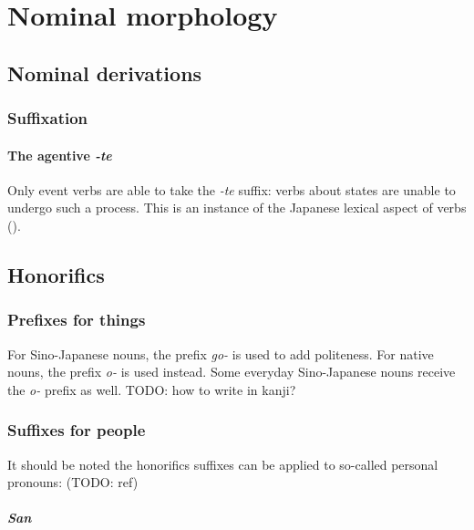 \documentclass[UTF8, a4paper, oneside, scheme=plain]{ctexrep}
\newcommand{\corpus}[1]{\emph{#1}}
\begin{document}
\chapter{Nominal morphology}

\section{Nominal derivations}

\subsection{Suffixation}

\subsubsection{The agentive \corpus{-te}}\label{sec:agentive-te}

Only event verbs are able to take the \corpus{-te} suffix:
verbs about states are unable to undergo such a process.
This is an instance of the Japanese lexical aspect of verbs ().

\section{Honorifics}\label{sec:nominal-polite}

\subsection{Prefixes for things}\label{sec:object-honorifics-prefix}

For Sino-Japanese nouns, the prefix \corpus{go-} is used to add politeness.
For native nouns, the prefix \corpus{o-} is used instead.
Some everyday Sino-Japanese nouns receive the \corpus{o-} prefix as well.
TODO: how to write in kanji?

\subsection{Suffixes for people}

It should be noted the honorifics suffixes can be applied to so-called personal pronouns: (TODO: ref)

\subsubsection{\corpus{San}}
\end{document}
